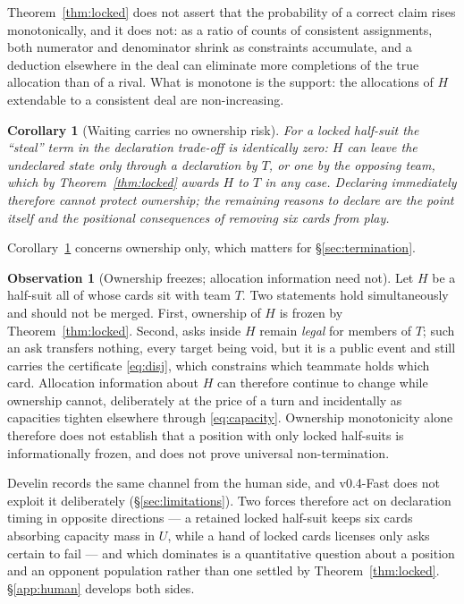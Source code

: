 \documentclass[11pt]{article}
\newtheorem{corollary}[theorem]{Corollary}
\theoremstyle{definition}
\newtheorem{observation}[theorem]{Observation}
\DeclareRobustCommand{\vfast}{\texorpdfstring{\mbox{v0.4-Fast}}{v0.4-Fast}}
\begin{document}
Theorem~\ref{thm:locked} does not assert that the probability of a correct claim
rises monotonically, and it does not: as a ratio of counts of consistent
assignments, both numerator and denominator shrink as constraints accumulate, and
a deduction elsewhere in the deal can eliminate more completions of the true
allocation than of a rival. What is monotone is the support: the allocations of
$H$ extendable to a consistent deal are non-increasing.

\begin{corollary}[Waiting carries no ownership risk]
\label{cor:wait}
For a locked half-suit the ``steal'' term in the declaration trade-off is
identically zero: $H$ can leave the undeclared state only through a declaration
by $T$, or one by the opposing team, which by Theorem~\ref{thm:locked} awards $H$
to $T$ in any case. Declaring immediately therefore cannot protect ownership; the
remaining reasons to declare are the point itself and the positional consequences
of removing six cards from play.
\end{corollary}

Corollary~\ref{cor:wait} concerns ownership only, which matters for
\S\ref{sec:termination}.

\begin{observation}[Ownership freezes; allocation information need not]
\label{obs:frozeninfo}
Let $H$ be a half-suit all of whose cards sit with team $T$. Two statements hold
simultaneously and should not be merged. First, ownership of $H$ is frozen by
Theorem~\ref{thm:locked}. Second, asks inside $H$ remain \emph{legal} for members
of $T$; such an ask transfers nothing, every target being void, but it is a
public event and still carries the certificate \eqref{eq:disj}, which constrains
which teammate holds which card. Allocation information about $H$ can therefore
continue to change while ownership cannot, deliberately at the price of a turn
and incidentally as capacities tighten elsewhere through \eqref{eq:capacity}.
Ownership monotonicity alone therefore does not establish that a position with
only locked half-suits is informationally frozen, and does not prove universal
non-termination.
\end{observation}

Develin \cite{develin} records the same channel from the human side, and
\vfast{} does not exploit it deliberately (\S\ref{sec:limitations}). Two forces
therefore act on declaration timing in opposite directions --- a retained locked
half-suit keeps six cards absorbing capacity mass in $U$, while a hand of locked
cards licenses only asks certain to fail --- and which dominates is a
quantitative question about a position and an opponent population rather than one
settled by Theorem~\ref{thm:locked}. \S\ref{app:human} develops both sides.
\end{document}
